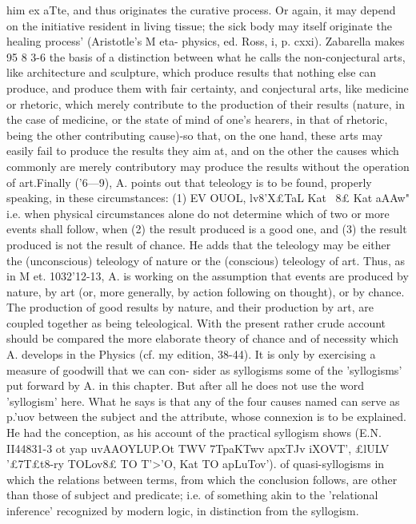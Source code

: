 {{{{{{{{{{{{{{{{{{{{{{{{{{{{{{{{{{{{{{{{{{{{{{{{{{{{{{{{{{{him ex aTte, and thus originates the curative process. Or again,
it may depend on the initiative resident in living tissue; the sick
body may itself originate the healing process' (Aristotle's M eta-
physics, ed. Ross, i, p. cxxi).
Zabarella makes 95 8 3-6 the basis of a distinction between what
he calls the non-conjectural arts, like architecture and sculpture,
which produce results that nothing else can produce, and produce
them with fair certainty, and conjectural arts, like medicine or
rhetoric, which merely contribute to the production of their
results (nature, in the case of medicine, or the state of mind of
one's hearers, in that of rhetoric, being the other contributing
cause)-so that, on the one hand, these arts may easily fail to
produce the results they aim at, and on the other the causes
which commonly are merely contributory may produce the
results without the operation of art.Finally ('6---9), A. points out that teleology is to be found,
properly speaking, in these circumstances: (1) EV OUOL, lv8'X£TaL
Kat ~8£ Kat aAAw" i.e. when physical circumstances alone do not
determine which of two or more events shall follow, when (2)
the result produced is a good one, and (3) the result produced is
not the result of chance. He adds that the teleology may be
either the (unconscious) teleology of nature or the (conscious)
teleology of art. Thus, as in M et. 1032'12-13, A. is working on the
assumption that events are produced by nature, by art (or, more
generally, by action following on thought), or by chance. The
production of good results by nature, and their production by art,
are coupled together as being teleological. With the present
rather crude account should be compared the more elaborate
theory of chance and of necessity which A. develops in the
Physics (cf. my edition, 38-44).
It is only by exercising a measure of goodwill that we can con-
sider as syllogisms some of the 'syllogisms' put forward by A.
in this chapter. But after all he does not use the word 'syllogism'
here. What he says is that any of the four causes named can serve
as p.'uov between the subject and the attribute, whose connexion
is to be explained. He had the conception, as his account of
the practical syllogism shows (E.N. II44831-3 ot yap uvAAOYLUP.Ot
TWV 7TpaKTwv apxTJv iXOVT', £lULV '£7T£t8-ry TOLov8£ TO T'>'O, Kat TO
apLuTov'). of quasi-syllogisms in which the relations between terms,
from which the conclusion follows, are other than those of subject
and predicate; i.e. of something akin to the 'relational inference'
recognized by modern logic, in distinction from the syllogism.
}}}}}}}}}}}}}}}}}}}}}}}}}}}}}}}}}}}}}}}}}}}}}}}}}}}}}}}}}}}
